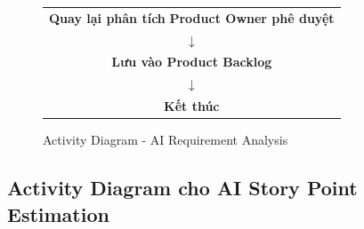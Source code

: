 \documentclass[12pt,a4paper]{report}
\begin{document}
\begin{figure}[H]
{\begin{minipage}{0.95\textwidth}
\begin{tabular}{c}
\textbf{Quay lại phân tích} \hspace{0.5cm} \textbf{Product Owner phê duyệt} \\
\hspace{2.5cm} $\downarrow$ \\
\hspace{2.5cm} \textbf{Lưu vào Product Backlog} \\
\hspace{2.5cm} $\downarrow$ \\
\hspace{2.5cm} \textbf{Kết thúc}
\end{tabular}
\end{minipage}
}
\caption{Activity Diagram - AI Requirement Analysis}
\label{fig:activity_requirement}
\end{figure}

\subsection{Activity Diagram cho AI Story Point Estimation}
\end{document}
